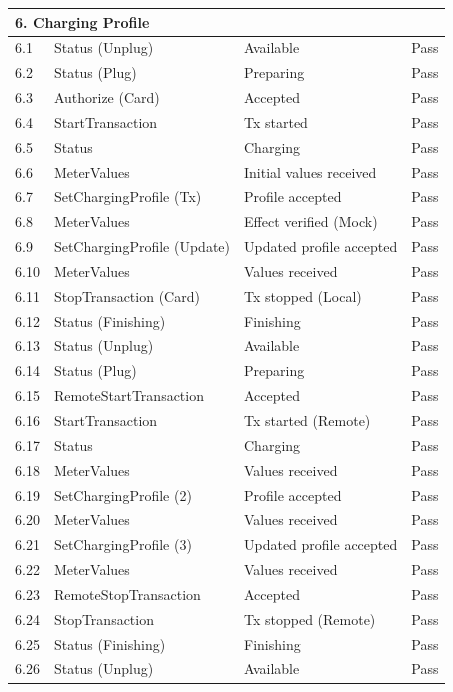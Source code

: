 \documentclass[a4paper,11pt]{report}
\begin{document}
\begin{footnotesize}
\begin{footnotesize}
\begin{longtable}{|p{1.0cm}|p{4.5cm}|p{6.5cm}|c|}
\multicolumn{4}{|l|}{\textbf{6. Charging Profile}} \\
\hline
6.1 & Status (Unplug) & Available & Pass \\
\hline
6.2 & Status (Plug) & Preparing & Pass \\
\hline
6.3 & Authorize (Card) & Accepted & Pass \\
\hline
6.4 & StartTransaction & Tx started & Pass \\
\hline
6.5 & Status & Charging & Pass \\
\hline
6.6 & MeterValues & Initial values received & Pass \\
\hline
6.7 & SetChargingProfile (Tx) & Profile accepted & Pass \\
\hline
6.8 & MeterValues & Effect verified (Mock) & Pass \\
\hline
6.9 & SetChargingProfile (Update) & Updated profile accepted & Pass \\
\hline
6.10 & MeterValues & Values received & Pass \\
\hline
6.11 & StopTransaction (Card) & Tx stopped (Local) & Pass \\
\hline
6.12 & Status (Finishing) & Finishing & Pass \\
\hline
6.13 & Status (Unplug) & Available & Pass \\
\hline
6.14 & Status (Plug) & Preparing & Pass \\
\hline
6.15 & RemoteStartTransaction & Accepted & Pass \\
\hline
6.16 & StartTransaction & Tx started (Remote) & Pass \\
\hline
6.17 & Status & Charging & Pass \\
\hline
6.18 & MeterValues & Values received & Pass \\
\hline
6.19 & SetChargingProfile (2) & Profile accepted & Pass \\
\hline
6.20 & MeterValues & Values received & Pass \\
\hline
6.21 & SetChargingProfile (3) & Updated profile accepted & Pass \\
\hline
6.22 & MeterValues & Values received & Pass \\
\hline
6.23 & RemoteStopTransaction & Accepted & Pass \\
\hline
6.24 & StopTransaction & Tx stopped (Remote) & Pass \\
\hline
6.25 & Status (Finishing) & Finishing & Pass \\
\hline
6.26 & Status (Unplug) & Available & Pass \\
\hline


\end{longtable}
\end{footnotesize}
\end{footnotesize}
\end{document}
